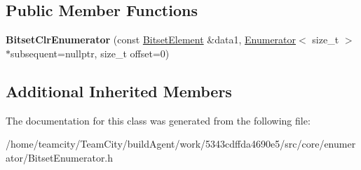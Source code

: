 \subsection*{Public Member Functions}
\begin{DoxyCompactItemize}
\item 
{\bfseries Bitset\+Clr\+Enumerator} (const \hyperlink{classBitsetElement}{Bitset\+Element} \&data1, \hyperlink{classEnumerator}{Enumerator}$<$ size\+\_\+t $>$ $\ast$subsequent=nullptr, size\+\_\+t offset=0)\hypertarget{classBitsetClrEnumerator_ac7b5a979fa9212e62c033848a81ddc7c}{}\label{classBitsetClrEnumerator_ac7b5a979fa9212e62c033848a81ddc7c}

\end{DoxyCompactItemize}
\subsection*{Additional Inherited Members}


The documentation for this class was generated from the following file\+:\begin{DoxyCompactItemize}
\item 
/home/teamcity/\+Team\+City/build\+Agent/work/5343cdffda4690e5/src/core/enumerator/Bitset\+Enumerator.\+h\end{DoxyCompactItemize}
